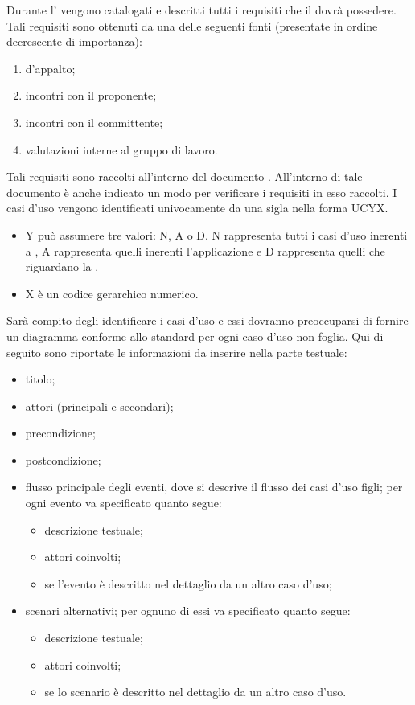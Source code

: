 			Durante l' vengono catalogati e descritti tutti i requisiti che il  dovrà possedere. Tali requisiti sono ottenuti da una delle seguenti fonti (presentate in ordine decrescente di importanza):
			\begin{enumerate}
				\item {} d’appalto;
				\item incontri con il proponente;
				\item incontri con il committente;
				\item valutazioni interne al gruppo di lavoro.
			\end{enumerate}
			Tali requisiti sono raccolti all'interno del documento . All'interno di tale documento è anche indicato un modo per verificare i requisiti in esso raccolti.
				 \label{sec:classificazioneUC}
					I casi d'uso vengono identificati univocamente da una sigla nella forma UCYX.
					\begin{itemize}
						\item Y può assumere tre valori: N, A o D. N rappresenta tutti i casi d'uso inerenti a , A rappresenta quelli inerenti l'applicazione  e D rappresenta quelli che riguardano la .
						\item X è un codice gerarchico numerico.
					\end{itemize}
					Sarà compito degli  identificare i casi d'uso e essi dovranno preoccuparsi di fornire un diagramma conforme allo standard  per ogni caso d'uso non foglia. Qui di seguito sono riportate le informazioni da inserire nella parte testuale:
					\begin{itemize}
						\item titolo;
						\item attori (principali e secondari);
						\item precondizione;
						\item postcondizione;
						\item flusso principale degli eventi, dove si descrive il flusso dei casi d'uso figli; per ogni evento va specificato quanto segue:
						\begin{itemize}
							\item descrizione testuale;
							\item attori coinvolti;
							\item se l’evento è descritto nel dettaglio da un altro caso d’uso;
						\end{itemize}
						\item scenari alternativi; per ognuno di essi va specificato quanto segue:
						\begin{itemize}
							\item descrizione testuale;
							\item attori coinvolti;
							\item se lo scenario è descritto nel dettaglio da un altro caso d’uso.
						\end{itemize}
					\end{itemize}
